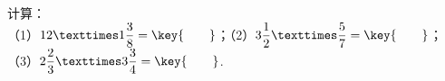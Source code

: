 计算：\\
（1）$12×1\dfrac{3}{8}=\key{\qquad}$；（2）$3\dfrac{1}{2}×\dfrac{5}{7}=\key{\qquad}$；
（3）$2\dfrac{2}{3}×3\dfrac{3}{4}=\key{\qquad}$.